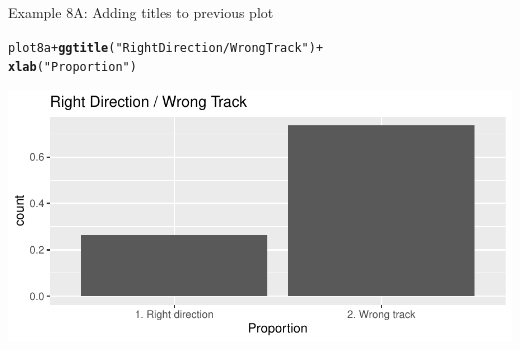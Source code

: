 \documentclass{beamer}\usepackage[]{graphicx}\usepackage[]{color}
\makeatletter
\newcommand{\hlstr}[1]{\textcolor[rgb]{0.192,0.494,0.8}{#1}}%
\newcommand{\hlopt}[1]{\textcolor[rgb]{0,0,0}{#1}}%
\newcommand{\hlstd}[1]{\textcolor[rgb]{0.345,0.345,0.345}{#1}}%
\newcommand{\hlkwd}[1]{\textcolor[rgb]{0.737,0.353,0.396}{\textbf{#1}}}%
\newenvironment{kframe}{%
 \def\at@end@of@kframe{}%
 \ifinner\ifhmode%
  \def\at@end@of@kframe{\end{minipage}}%
  \begin{minipage}{\columnwidth}%
 \fi\fi%
 \def\FrameCommand##1{\hskip\@totalleftmargin \hskip-\fboxsep
 \colorbox{shadecolor}{##1}\hskip-\fboxsep
     \hskip-\linewidth \hskip-\@totalleftmargin \hskip\columnwidth}%
 \MakeFramed {\advance\hsize-\width
   \@totalleftmargin\z@ \linewidth\hsize
   \@setminipage}}%
 {\par\unskip\endMakeFramed%
 \at@end@of@kframe}
\newenvironment{knitrout}{}{} %
\makeatother
\begin{document}
\begin{frame}[fragile]{Example 8A: Adding titles to previous plot}
\begin{knitrout}
\color{fgcolor}\begin{kframe}
\begin{alltt}
\hlstd{plot8a} \hlopt{+} \hlkwd{ggtitle}\hlstd{(}\hlstr{"Right Direction / Wrong Track"}\hlstd{)} \hlopt{+}
    \hlkwd{xlab}\hlstd{(}\hlstr{"Proportion"}\hlstd{)}
\end{alltt}
\end{kframe}
\includegraphics[width=0.95\linewidth]{figure/unnamed-chunk-32-1} 
\end{knitrout}
\end{frame}
\end{document}
